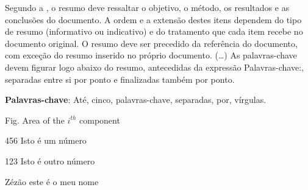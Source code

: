 \documentclass[12pt, %
openright, 
oneside, %
a4paper,    %
brazil]{facom-ufu-abntex2}
\begin{document}





\begin{resumo} %
 Segundo a , o resumo deve ressaltar o
 objetivo, o método, os resultados e as conclusões do documento. A ordem e a extensão
 destes itens dependem do tipo de resumo (informativo ou indicativo) e do
 tratamento que cada item recebe no documento original. O resumo deve ser
 precedido da referência do documento, com exceção do resumo inserido no
 próprio documento. (\ldots) As palavras-chave devem figurar logo abaixo do
 resumo, antecedidas da expressão Palavras-chave:, separadas entre si por
 ponto e finalizadas também por ponto.

 \vspace{\onelineskip}
    
 \noindent
 \textbf{Palavras-chave}: Até, cinco, palavras-chave, separadas, por, vírgulas. %
\end{resumo}

\listoffigures*
\cleardoublepage

\listoftables*
\cleardoublepage



\begin{siglas} %
  \item[Fig.] Area of the $i^{th}$ component
  \item[456] Isto é um número
  \item[123] Isto é outro número
  \item[Zézão] este é o meu nome
\end{siglas}
\end{document}
